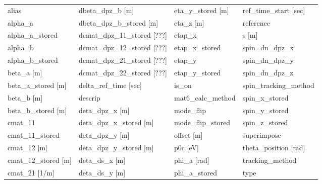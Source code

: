  \begin{tabular}{llll} \toprule
alias                            & dbeta_dpz_b [m]                  & eta_y_stored [m]                 & ref_time_start [sec]             \\
alpha_a                          & dbeta_dpz_b_stored [m]           & eta_z [m]                        & reference                        \\
alpha_a_stored                   & dcmat_dpz_11_stored [???]        & etap_x                           & s [m]                            \\
alpha_b                          & dcmat_dpz_12_stored [???]        & etap_x_stored                    & spin_dn_dpz_x                    \\
alpha_b_stored                   & dcmat_dpz_21_stored [???]        & etap_y                           & spin_dn_dpz_y                    \\
beta_a [m]                       & dcmat_dpz_22_stored [???]        & etap_y_stored                    & spin_dn_dpz_z                    \\
beta_a_stored [m]                & delta_ref_time [sec]             & is_on                            & spin_tracking_method             \\
beta_b [m]                       & descrip                          & mat6_calc_method                 & spin_x_stored                    \\
beta_b_stored [m]                & deta_dpz_x [m]                   & mode_flip                        & spin_y_stored                    \\
cmat_11                          & deta_dpz_x_stored [m]            & mode_flip_stored                 & spin_z_stored                    \\
cmat_11_stored                   & deta_dpz_y [m]                   & offset [m]                       & superimpose                      \\
cmat_12 [m]                      & deta_dpz_y_stored [m]            & p0c [eV]                         & theta_position [rad]             \\
cmat_12_stored [m]               & deta_ds_x [m]                    & phi_a [rad]                      & tracking_method                  \\
cmat_21 [1/m]                    & deta_ds_y [m]                    & phi_a_stored                     & type                             \\

\end{tabular}

